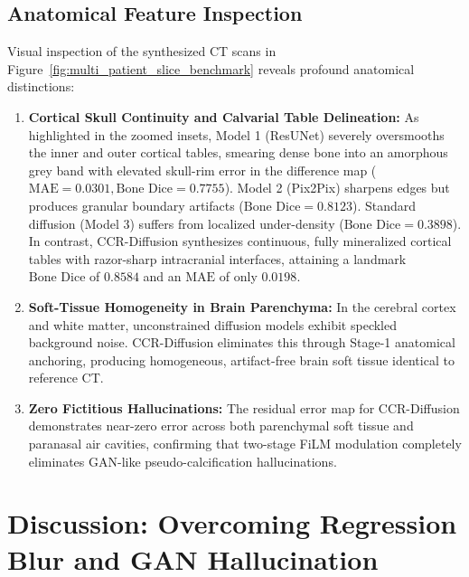 \subsection{Anatomical Feature Inspection}
Visual inspection of the synthesized CT scans in Figure~\ref{fig:multi_patient_slice_benchmark} reveals profound anatomical distinctions:
\begin{enumerate}
    \item \textbf{Cortical Skull Continuity and Calvarial Table Delineation:} As highlighted in the zoomed insets, Model 1 (ResUNet) severely oversmooths the inner and outer cortical tables, smearing dense bone into an amorphous grey band with elevated skull-rim error in the difference map ($\text{MAE} = 0.0301, \text{Bone Dice} = 0.7755$). Model 2 (Pix2Pix) sharpens edges but produces granular boundary artifacts ($\text{Bone Dice} = 0.8123$). Standard diffusion (Model 3) suffers from localized under-density ($\text{Bone Dice} = 0.3898$). In contrast, CCR-Diffusion synthesizes continuous, fully mineralized cortical tables with razor-sharp intracranial interfaces, attaining a landmark $\text{Bone Dice}$ of $\mathbf{0.8584}$ and an $\text{MAE}$ of only $\mathbf{0.0198}$.
    \item \textbf{Soft-Tissue Homogeneity in Brain Parenchyma:} In the cerebral cortex and white matter, unconstrained diffusion models exhibit speckled background noise. CCR-Diffusion eliminates this through Stage-1 anatomical anchoring, producing homogeneous, artifact-free brain soft tissue identical to reference CT.
    \item \textbf{Zero Fictitious Hallucinations:} The residual error map for CCR-Diffusion demonstrates near-zero error across both parenchymal soft tissue and paranasal air cavities, confirming that two-stage FiLM modulation completely eliminates GAN-like pseudo-calcification hallucinations.
\end{enumerate}

\section{Discussion: Overcoming Regression Blur and GAN Hallucination}

